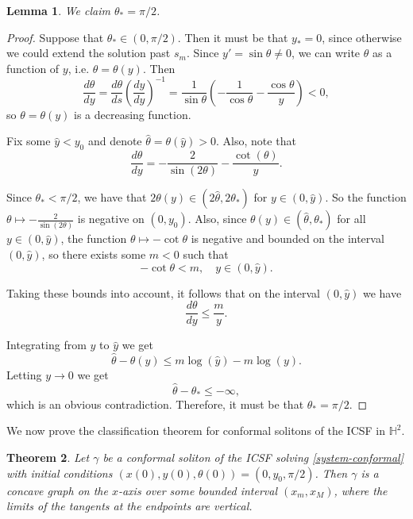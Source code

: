 \documentclass[12pt]{amsart}
\theoremstyle{plain}
\newtheorem{theorem}{Theorem}[section]
\newtheorem{lemma}[theorem]{Lemma}
\theoremstyle{definition}
\def\h{\mathbb H}
\begin{document}
\begin{lemma}
\label{lem-conformal-angles} We claim  $\theta_\ast = \pi/2$.
\end{lemma}

\begin{proof}
   Suppose that $\theta_\ast \in (0, \pi/2)$. Then it must be that $y_\ast = 0$, since otherwise we could extend the solution past $s_m$. Since $y' = \sin\theta \neq 0$, we can write $\theta$ as a function of $y$, i.e. $\theta = \theta(y)$. Then
   $$\frac{d\theta}{dy} = \frac{d\theta}{ds}   \left( \frac{dy}{dy}\right)^{-1} = \frac{1}{\sin\theta}  \left(- \frac{1}{\cos\theta} - \frac{\cos\theta}{y} \right) < 0,$$
   so $\theta = \theta(y)$ is a decreasing function.

   Fix some $\hat{y} < y_0$ and denote $\hat{\theta} = \theta(\hat{y}) > 0$. Also, note that $$\frac{d\theta}{dy} = - \frac{2}{\sin(2\theta)} - \frac{\cot(\theta)}{y}.$$

   Since $\theta_\ast < \pi/2$, we have that $2\theta(y) \in (2\hat{\theta}, 2\theta_\ast)$ for $y \in (0, \hat{y})$. So the function $\theta \mapsto - \frac{2}{\sin(2\theta)}$ is negative on $(0,y_0)$. Also, since $\theta(y) \in (\hat{\theta}, \theta_\ast)$ for all $y \in (0, \hat{y})$, the function $\theta \mapsto -\cot\theta$ is negative and bounded on the interval $(0, \hat{y})$, so there exists some $m < 0$ such that $$-\cot\theta < m, \quad y \in (0, \hat{y}).$$

   Taking these bounds into account, it follows that on the interval $(0, \hat{y})$ we have $$\frac{d\theta}{dy} \leq \frac{m}{y}.$$

   Integrating from $y$ to $\hat{y}$ we get $$\hat{\theta} - \theta(y) \leq m \log(\hat{y}) - m \log(y).$$ Letting $y \to 0$ we get $$\hat{\theta} - \theta_\ast \leq - \infty,$$ which is an obvious contradiction. Therefore, it must be that $\theta_\ast = \pi/2$.
\end{proof}

We now prove the classification theorem for conformal solitons of the ICSF in $\h^2$.

\begin{theorem}
\label{t67}
   Let $\gamma$  be a conformal soliton of the ICSF solving \eqref{system-conformal} with initial conditions $(x(0),y(0),\theta(0))=(0,y_0,\pi/2)$. Then  $\gamma$ is a concave graph on the $x$-axis  over some bounded interval $(x_m, x_M)$, where the limits of the tangents at the endpoints are vertical.
    \end{theorem}
\end{document}
